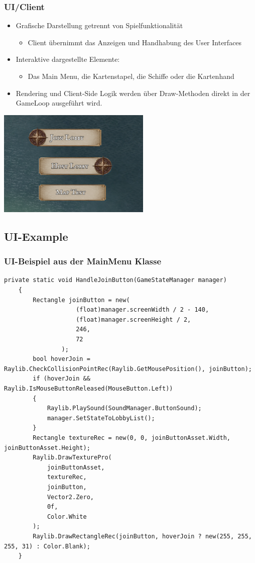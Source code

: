 \documentclass{beamer}
\begin{document}
\begin{frame}
  \frametitle{UI/Client}
  \begin{itemize}
    \item Grafische Darstellung getrennt von Spielfunktionalität
      \begin{itemize}
        \item Client übernimmt das Anzeigen und Handhabung des User Interfaces 
      \end{itemize}
    \item Interaktive dargestellte Elemente:
    \begin{itemize} 
      \item Das Main Menu, die Kartenstapel, die Schiffe oder die Kartenhand
    \end{itemize}
    \item Rendering und Client-Side Logik werden über Draw-Methoden direkt in der GameLoop ausgeführt wird.
  \end{itemize} 
  \centering
  \includegraphics[width=0.55\textwidth]{MainMenuZoomIn.png}
\end{frame}

\subsection{UI-Example}
\begin{frame}[fragile]
  \frametitle{UI-Beispiel aus der MainMenu Klasse}
  \begin{lstlisting}[language=CSharp, basicstyle=\ttfamily\tiny, breaklines=true]
    private static void HandleJoinButton(GameStateManager manager)
    {
        Rectangle joinButton = new(
                    (float)manager.screenWidth / 2 - 140,
                    (float)manager.screenHeight / 2,
                    246,
                    72
                );
        bool hoverJoin = Raylib.CheckCollisionPointRec(Raylib.GetMousePosition(), joinButton);
        if (hoverJoin && Raylib.IsMouseButtonReleased(MouseButton.Left))
        {
            Raylib.PlaySound(SoundManager.ButtonSound);
            manager.SetStateToLobbyList();
        }
        Rectangle textureRec = new(0, 0, joinButtonAsset.Width, joinButtonAsset.Height);
        Raylib.DrawTexturePro(
            joinButtonAsset,
            textureRec,
            joinButton,
            Vector2.Zero,
            0f,
            Color.White
        );
        Raylib.DrawRectangleRec(joinButton, hoverJoin ? new(255, 255, 255, 31) : Color.Blank);
    }
  \end{lstlisting}
\end{frame}
\end{document}
